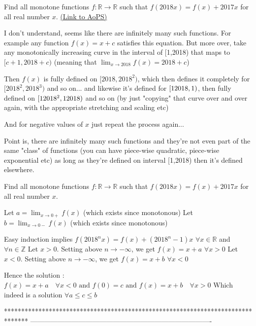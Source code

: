 \begin{problem}
	Find all monotone functions $f: \mathbb{R} \longrightarrow \mathbb{R}$ such that $f(2018x)=f(x)+2017x$ for all real number $x$.
	\flushright \href{https://artofproblemsolving.com/community/c6h1631378}{(Link to AoPS)}
\end{problem}



\begin{solution}
	I don't understand, seems like there are infinitely many such functions. For example any function $f(x) = x+c$ satisfies this equation. But more over, take any monotonically increasing curve in the interval of [1,2018) that maps to $[c+1, 2018+c)$ (meaning that $\lim_{x \to 2018} f(x) = 2018+c$)

Then $f(x)$ is fully defined on $[2018,2018^2)$, which then defines it completely for $[2018^2, 2018^3)$ and so on... and likewise it's defined for $[1\/2018,1)$, then fully defined on $[1\/2018^2, 1\/2018)$ and so on (by just "copying" that curve over and over again, with the appropriate stretching and scaling etc)

And for negative values of $x$ just repeat the process again...

Point is, there are infinitely many such functions and they're not even part of the same "class" of functions (you can have piece-wise quadratic, piece-wise exponential etc) as long as they're defined on interval [1,2018) then it's defined elsewhere.
\end{solution}



\begin{solution}
	\begin{tcolorbox}Find all monotone functions $f: \mathbb{R} \longrightarrow \mathbb{R}$ such that $f(2018x)=f(x)+2017x$ for all real number $x$.\end{tcolorbox}
Let $a=\lim_{x\to 0+}f(x)$ (which exists since monotonous)
Let $b=\lim_{x\to 0-}f(x)$ (which exists since monotonous)

Easy induction implies $f(2018^nx)=f(x)+(2018^n-1)x$ $\forall x\in\mathbb R$ and $\forall n\in\mathbb Z$
Let $x>0$. Setting above $n\to-\infty$, we get $f(x)=x+a$ $\forall x>0$
Let $x<0$. Setting above $n\to-\infty$, we get $f(x)=x+b$ $\forall x<0$

Hence the solution :
$\boxed{f(x)=x+a\quad\forall x<0\text{  and  }f(0)=c\text{  and  }f(x)=x+b\quad\forall x>0}$
Which indeed is a solution $\forall a\le c\le b$



\end{solution}
*******************************************************************************
-------------------------------------------------------------------------------

